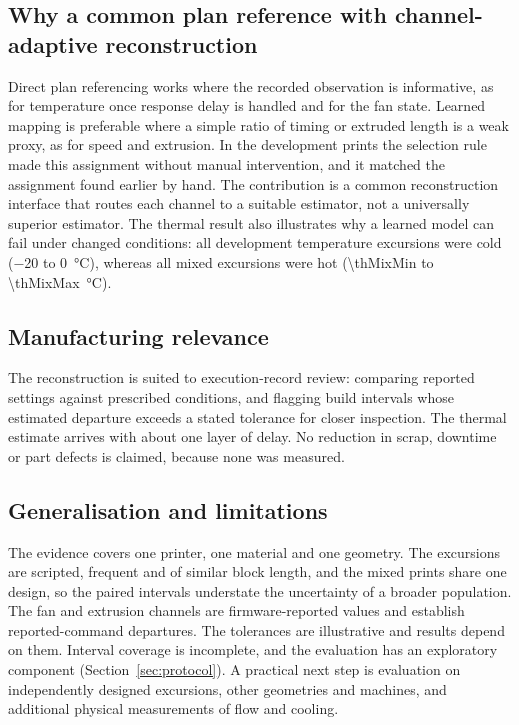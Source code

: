 \documentclass[10pt,a4paper,twocolumn]{article}
\begin{document}
\subsection{Why a common plan reference with channel-adaptive reconstruction}
Direct plan referencing works where the recorded observation is informative, as for temperature once response delay is handled and for the fan state. Learned mapping is preferable where a simple ratio of timing or extruded length is a weak proxy, as for speed and extrusion. In the development prints the selection rule made this assignment without manual intervention, and it matched the assignment found earlier by hand. The contribution is a common reconstruction interface that routes each channel to a suitable estimator, not a universally superior estimator. The thermal result also illustrates why a learned model can fail under changed conditions: all development temperature excursions were cold (\SI{-20}{} to \SI{0}{\celsius}), whereas all mixed excursions were hot (\SI{\thMixMin}{} to \SI{\thMixMax}{\celsius}).

\subsection{Manufacturing relevance}
The reconstruction is suited to execution-record review: comparing reported settings against prescribed conditions, and flagging build intervals whose estimated departure exceeds a stated tolerance for closer inspection. The thermal estimate arrives with about one layer of delay. No reduction in scrap, downtime or part defects is claimed, because none was measured.

\subsection{Generalisation and limitations}
The evidence covers one printer, one material and one geometry. The excursions are scripted, frequent and of similar block length, and the mixed prints share one design, so the paired intervals understate the uncertainty of a broader population. The fan and extrusion channels are firmware-reported values and establish reported-command departures. The tolerances are illustrative and results depend on them. Interval coverage is incomplete, and the evaluation has an exploratory component (Section~\ref{sec:protocol}). A practical next step is evaluation on independently designed excursions, other geometries and machines, and additional physical measurements of flow and cooling.
\end{document}
